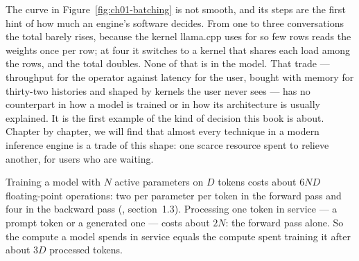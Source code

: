 
The curve in Figure~\ref{fig:ch01-batching} is not smooth, and its steps are
the first hint of how much an engine's software decides. From one to three
conversations the total barely rises, because the kernel llama.cpp uses for so
few rows reads the weights once per row; at four it switches to a kernel that
shares each load among the rows, and the total doubles. None of that is in the
model. That trade --- throughput for the operator against latency for the
user, bought with memory for thirty-two histories and shaped by kernels the
user never sees --- has no counterpart in how a model is trained or in how its
architecture is usually explained. It is the first example of the kind of
decision this book is about. Chapter by chapter, we will find that almost every
technique in a modern inference engine is a trade of this shape: one scarce
resource spent to relieve another, for users who are waiting.



Training a model with $N$ active parameters on $D$ tokens costs about $6ND$
floating-point operations: two per parameter per token in the forward pass and
four in the backward pass (\cite{kaplan2020scaling}, section~1.3). Processing
one token in service --- a prompt token or a generated one --- costs about
$2N$: the forward pass alone. So the compute a model spends in service equals
the compute spent training it after about $3D$ processed tokens.

